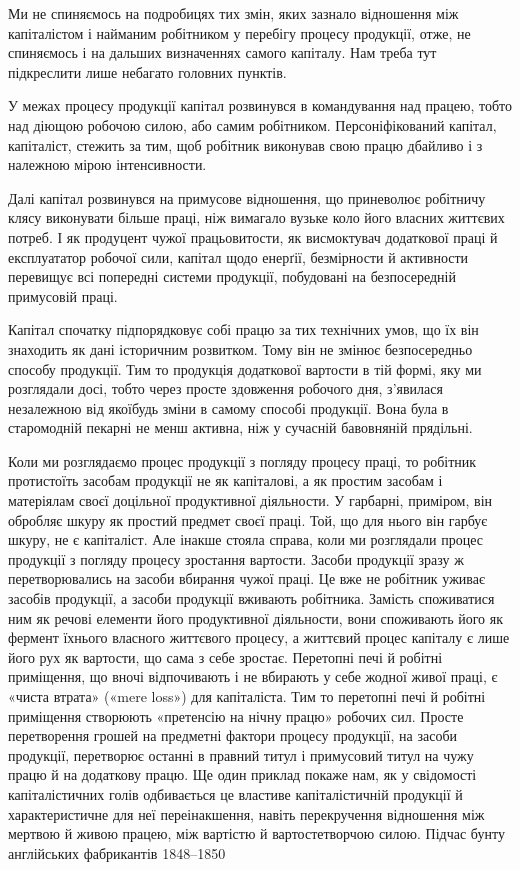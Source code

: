 
Ми не спиняємось на подробицях тих змін, яких зазнало відношення
між капіталістом і найманим робітником у перебігу
процесу продукції, отже, не спиняємось і на дальших визначеннях
самого капіталу. Нам треба тут підкреслити лише небагато головних
пунктів.

У межах процесу продукції капітал розвинувся в командування
над працею, тобто над діющою робочою силою, або самим робітником.
Персоніфікований капітал, капіталіст, стежить за тим, щоб
робітник виконував свою працю дбайливо і з належною мірою
інтенсивности.

Далі капітал розвинувся на примусове відношення, що приневолює
робітничу клясу виконувати більше праці, ніж вимагало
вузьке коло його власних життєвих потреб. І як продуцент чужої
працьовитости, як висмоктувач додаткової праці й експлуататор
робочої сили, капітал щодо енерґії, безмірности й активности
перевищує всі попередні системи продукції, побудовані на безпосередній
примусовій праці.

Капітал спочатку підпорядковує собі працю за тих технічних
умов, що їх він знаходить як дані історичним розвитком. Тому він
не змінює безпосередньо способу продукції. Тим то продукція
додаткової вартости в тій формі, яку ми розглядали досі, тобто
через просте здовження робочого дня, з’явилася незалежною від
якоїбудь зміни в самому способі продукції. Вона була в старомодній
пекарні не менш активна, ніж у сучасній бавовняній прядільні.

Коли ми розглядаємо процес продукції з погляду процесу
праці, то робітник протистоїть засобам продукції не як капіталові,
а як простим засобам і матеріялам своєї доцільної продуктивної
діяльности. У гарбарні, приміром, він обробляє шкуру як простий
предмет своєї праці. Той, що для нього він гарбує шкуру, не є
капіталіст. Але інакше стояла справа, коли ми розглядали процес
продукції з погляду процесу зростання вартости. Засоби продукції
зразу ж перетворювались на засоби вбирання чужої праці. Це
вже не робітник уживає засобів продукції, а засоби продукції
вживають робітника. Замість споживатися ним як речові елементи
його продуктивної діяльности, вони споживають його як
фермент їхнього власного життєвого процесу, а життєвий процес
капіталу є лише його рух як вартости, що сама з себе зростає.
Перетопні печі й робітні приміщення, що вночі відпочивають
і не вбирають у себе жодної живої праці, є «чиста втрата» («mere
loss») для капіталіста. Тим то перетопні печі й робітні приміщення
створюють «претенсію на нічну працю» робочих сил. Просте
перетворення грошей на предметні фактори процесу продукції,
на засоби продукції, перетворює останні в правний титул і примусовий
титул на чужу працю й на додаткову працю. Ще один
приклад покаже нам, як у свідомості капіталістичних голів одбивається
це властиве капіталістичній продукції й характеристичне
для неї переінакшення, навіть перекручення відношення між
мертвою й живою працею, між вартістю й вартостетворчою
силою. Підчас бунту англійських фабрикантів 1848--1850~
\parbreak{}  %
